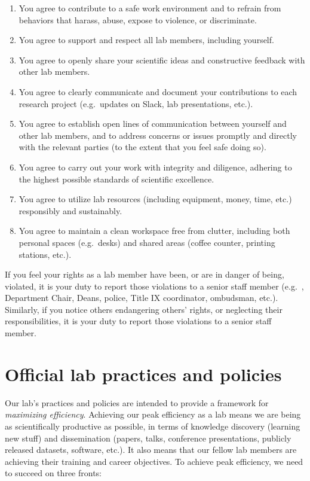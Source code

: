 \documentclass{tufte-book} %
\begin{document}
\begin{enumerate}
 \item You agree to contribute to a safe work environment and to refrain from behaviors that harass, abuse, expose to violence, or discriminate.
 \item You agree to support and respect all lab members, including yourself.
 \item You agree to openly share your scientific ideas and constructive feedback with other lab members.
 \item You agree to clearly communicate and document your contributions to each research project (e.g.\ updates on Slack, lab presentations, etc.).
 \item You agree to establish open lines of communication between yourself and other lab members, and to address concerns or issues promptly and
 directly with the relevant parties (to the extent that you feel safe doing so).
 \item You agree to carry out your work with integrity and diligence, adhering to the highest possible standards of scientific excellence.
 \item You agree to utilize lab resources (including equipment, money, time, etc.) responsibly and sustainably.
 \item You agree to maintain a clean workspace free from clutter, including both personal spaces (e.g.\ desks) and shared areas (coffee counter, printing stations, etc.).
\end{enumerate}


\noindent If you feel your rights as a lab member have been, or are in danger of being, violated, it is your duty to report those violations to a senior staff member (e.g.\ \director, Department Chair, Deans, police, Title IX coordinator, ombudsman, etc.). Similarly, if you notice others endangering others' rights, or neglecting their responsibilities, it is your duty to report those violations to a senior staff member.

\chapter{Official lab practices and policies}\label{ch:policy}
Our lab's practices and policies are intended to provide a framework for \textit{maximizing efficiency}. Achieving our peak efficiency as a lab means we are being as scientifically productive as possible, in terms of knowledge discovery (learning new stuff) and dissemination (papers, talks, conference presentations, publicly released datasets, software, etc.). It also means that our fellow lab members are achieving their training and career objectives. To achieve peak efficiency, we need to succeed on three fronts:
\end{document}
